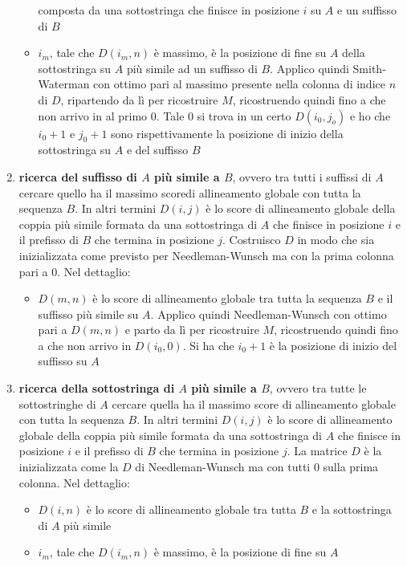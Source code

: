 \documentclass[a4paper,12pt, oneside]{book}
\begin{document}
\begin{enumerate}
\begin{itemize}
    composta da una sottostringa che finisce in posizione $i$ su $A$ e un
    suffisso di  $B$  
    \item $i_m$, tale che $D(i_m,n)$ è massimo, è la posizione di fine su $A$
    della sottostringa su $A$ più simile ad un suffisso di
    $B$. Applico quindi Smith-Waterman con ottimo pari al massimo presente
    nella colonna di indice $n$ di $D$, ripartendo da lì per ricostruire $M$,
    ricostruendo quindi fino a che non arrivo in al primo 0. Tale 0 si trova in
    un certo $D(i_0,j_o)$ e ho che $i_0+1$ e $j_0+1$ sono rispettivamente la
    posizione di inizio della sottostringa su $A$ e del suffisso $B$
  \end{itemize} 
  \item \textbf{ricerca del suffisso di $A$ più simile a $B$}, ovvero tra tutti
  i suffissi di $A$ cercare quello ha il massimo scoredi allineamento globale
  con tutta la sequenza $B$. In altri termini $D(i,j)$ è lo score di
  allineamento globale della coppia più simile formata da una sottostringa di
  $A$ che finisce in posizione $i$ e il prefisso di $B$ che termina in posizione
  $j$. Costruisco $D$ in modo che sia inizializzata come previsto per
  Needleman-Wunsch ma con la prima colonna pari a 0. Nel dettaglio: 
   \begin{itemize}
    \item $D(m,n)$ è lo score di allineamento globale tra tutta la sequenza $B$
    e il suffisso più simile su $A$. Applico quindi Needleman-Wunsch con ottimo
    pari a $D(m,n)$ e parto da lì per ricostruire $M$, ricostruendo quindi fino
    a che non arrivo in $D(i_0,0)$. Si ha che $i_0+1$ è la posizione di inizio
    del suffisso su $A$
  \end{itemize}
  \item \textbf{ricerca della sottostringa di $A$ più simile a $B$}, ovvero tra
  tutte le sottostringhe di $A$ cercare quella ha il massimo score di
  allineamento globale con tutta la sequenza $B$. In altri termini $D(i,j)$ è lo
  score di allineamento globale della coppia più simile formata da una
  sottostringa di $A$ che finisce in posizione $i$ e il prefisso di $B$ che
  termina in posizione $j$. La matrice $D$ è la inizializzata come la $D$ di
  Needleman-Wunsch ma con tutti $0$ sulla prima colonna. Nel dettaglio:  
  \begin{itemize}
    \item $D(i,n)$ è lo score di allineamento globale tra tutta $B$ e la
    sottostringa di $A$ più simile 
    \item $i_m$, tale che $D(i_m,n)$ è massimo, è la posizione di fine su $A$

\end{itemize}
\end{enumerate}
\end{document}
